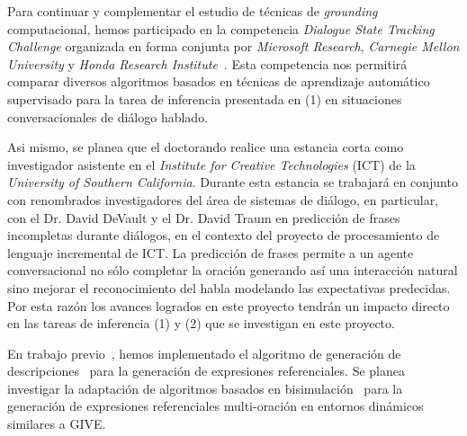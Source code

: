 \documentclass[10.9pt,a4paper]{article}
\begin{document}
Para continuar y complementar el estudio de t\'ecnicas de \emph{grounding} 
computacional, hemos participado en la competencia \emph{Dialogue State 
Tracking Challenge} organizada en forma conjunta por 
\emph{Microsoft Research}, \emph{Carnegie Mellon University} 
y \emph{Honda Research Institute}~\citep{williams:2012:SDCTD}. 
Esta competencia nos permitir\'a comparar diversos algoritmos basados en 
t\'ecnicas de aprendizaje autom\'atico supervisado para la tarea de inferencia 
presentada en (1) en situaciones conversacionales de di\'alogo hablado.

Asi mismo, se planea que el doctorando realice una estancia corta como
investigador asistente en el \emph{Institute for Creative Technologies} (ICT) 
de la \emph{University of Southern California}. Durante esta estancia se
trabajar\'a en conjunto con renombrados investigadores del \'area de sistemas
de di\'alogo, en particular, 
con el Dr. David DeVault y el Dr. David Traum en predicci\'on de frases 
incompletas durante di\'alogos, en el contexto del proyecto de procesamiento 
de lenguaje incremental de ICT. La predicci\'on de frases permite a un 
agente conversacional no s\'olo completar la oraci\'on generando as\'i una 
interacci\'on natural sino mejorar el reconocimiento del habla modelando 
las expectativas predecidas. Por esta raz\'on los avances logrados en este 
proyecto tendr\'an un impacto directo en las tareas de inferencia (1) y (2) que 
se investigan en este proyecto.

En trabajo previo~\citep{racc:ENLG11}, hemos implementado el 
algoritmo de generaci\'on de descripciones~\citep{dale95} para la 
generaci\'on de expresiones referenciales. Se planea investigar la 
adaptaci\'on de algoritmos basados en 
bisimulaci\'on~\citep{arec:refe08,arec:usin11,altamirano-areces-benotti:2012:POSTERS} para la generaci\'on de 
expresiones referenciales multi-oraci\'on en entornos din\'amicos similares 
a GIVE.
\end{document}
